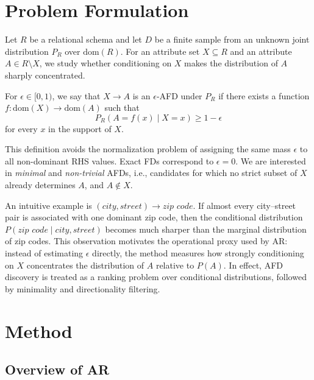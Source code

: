 \documentclass[conference]{IEEEtran}
\begin{document}
\section{Problem Formulation}\label{sec:problem}

Let $R$ be a relational schema and let $D$ be a finite sample from an unknown joint distribution $P_R$ over $\mathrm{dom}(R)$. For an attribute set $X \subseteq R$ and an attribute $A \in R \setminus X$, we study whether conditioning on $X$ makes the distribution of $A$ sharply concentrated.

\begin{definition}
For $\epsilon \in [0,1)$, we say that $X \to A$ is an $\epsilon$-AFD under $P_R$ if there exists a function $f:\mathrm{dom}(X)\to\mathrm{dom}(A)$ such that
\begin{equation}
    P_R(A = f(x) \mid X = x) \ge 1-\epsilon
\end{equation}
for every $x$ in the support of $X$.
\end{definition}

This definition avoids the normalization problem of assigning the same mass $\epsilon$ to all non-dominant RHS values. Exact FDs correspond to $\epsilon = 0$. We are interested in \emph{minimal} and \emph{non-trivial} AFDs, i.e., candidates for which no strict subset of $X$ already determines $A$, and $A \notin X$.

An intuitive example is $(\textit{city}, \textit{street}) \to \textit{zip code}$. If almost every city--street pair is associated with one dominant zip code, then the conditional distribution $P(\textit{zip code}\mid \textit{city},\textit{street})$ becomes much sharper than the marginal distribution of zip codes. This observation motivates the operational proxy used by AR: instead of estimating $\epsilon$ directly, the method measures how strongly conditioning on $X$ concentrates the distribution of $A$ relative to $P(A)$. In effect, AFD discovery is treated as a ranking problem over conditional distributions, followed by minimality and directionality filtering.

\section{Method}\label{sec:method}

\subsection{Overview of AR}
\end{document}
